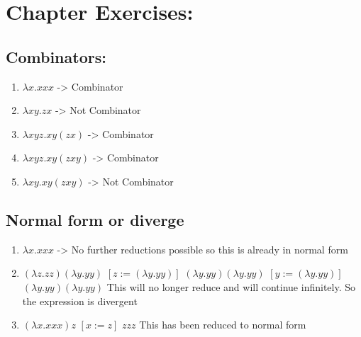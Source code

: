 \documentclass[11pt]{article}
\author{Abhigya Maskay}
\date{\today}
\title{}
\begin{document}
\section{Chapter Exercises:}
\label{sec:org606ba69}
\subsection{Combinators:}
\label{sec:orgd9b11cb}
\begin{enumerate}
\item \({\lambda}x.xxx\) -> Combinator
\item \({\lambda}xy.zx\) -> Not Combinator
\item \({\lambda}xyz.xy(zx)\) -> Combinator
\item \({\lambda}xyz.xy(zxy)\) -> Combinator
\item \({\lambda}xy.xy(zxy)\) -> Not Combinator
\end{enumerate}
\subsection{Normal form or diverge}
\label{sec:orgcfbd50a}
\begin{enumerate}
\item \({\lambda}x.xxx\) -> No further reductions possible so this is already in normal form
\item \(({\lambda}z.zz) ({\lambda}y.yy)\)
\([z := ({\lambda}y.yy)]\)
\(({\lambda}y.yy)({\lambda}y.yy)\)
\([ y := ({\lambda}y.yy)]\)
\(({\lambda}y.yy)({\lambda}y.yy)\)
This will no longer reduce and will continue infinitely. So the expression is divergent
\item \(({\lambda}x.xxx)z\)
\([x := z]\)
\(zzz\)
This has been reduced to normal form
\end{enumerate}
\end{document}

